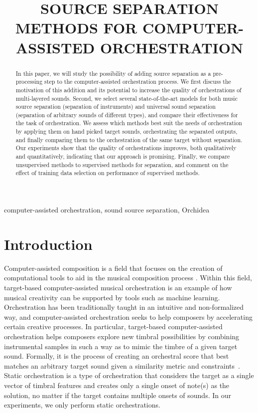 \documentclass{article}
\title{SOURCE SEPARATION METHODS FOR COMPUTER-ASSISTED ORCHESTRATION}
\begin{document}

\maketitle

\begin{abstract}
  In this paper, we will study the possibility of adding source separation as a pre-processing step to the computer-assisted orchestration process. We first discuss the motivation of this addition and its potential to increase the quality of orchestrations of multi-layered sounds. Second, we select several state-of-the-art models for both music source separation (separation of instruments) and universal sound separation (separation of arbitrary sounds of different types), and compare their effectiveness for the task of orchestration. We assess which methods best suit the needs of orchestration by applying them on hand picked target sounds, orchestrating the separated outputs, and finally comparing them to the orchestration of the same target without separation. Our experiments show that the quality of orchestrations improves, both qualitatively and quantitatively, indicating that our approach is promising. Finally, we compare unsupervised methods to supervised methods for separation, and comment on the effect of training data selection on performance of supervised methods.
\end{abstract}
%
\begin{keywords}
computer-assisted orchestration, sound source separation, Orchidea
\end{keywords}
%
\section{Introduction}\label{sec:introduction}
  Computer-assisted composition is a field that focuses on the creation of computational tools to aid in the musical composition process \cite{FerVic2013, Ari2005}. Within this field, target-based computer-assisted musical orchestration is an example of how musical creativity can be supported by tools such as machine learning. Orchestration has been traditionally taught in an intuitive and non-formalized way, and computer-assisted orchestration seeks to help composers by accelerating certain creative processes. In particular, target-based computer-assisted orchestration helps composers explore new timbral possibilities by combining instrumental samples in such a way as to mimic the timbre of a given target sound. Formally, it is the process of creating an orchestral score that best matches an arbitrary target sound given a similarity metric and constraints~\cite{Maresz2003}. Static orchestration is a type of orchestration that considers the target as a single vector of timbral features and creates only a single onset of note(s) as the solution, no matter if the target contains multiple onsets of sounds. In our experiments, we only perform static orchestrations.
  
\end{document}
